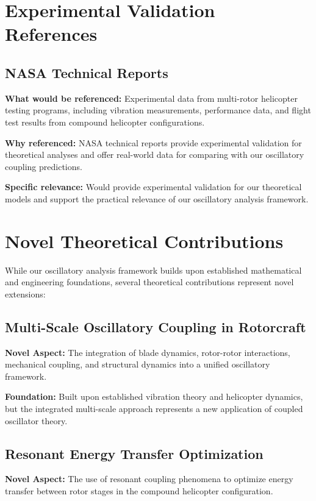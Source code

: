 \documentclass{article}
\begin{document}
\section{Experimental Validation References}

\subsection{NASA Technical Reports}

\textbf{What would be referenced:} Experimental data from multi-rotor helicopter testing programs, including vibration measurements, performance data, and flight test results from compound helicopter configurations.

\textbf{Why referenced:} NASA technical reports provide experimental validation for theoretical analyses and offer real-world data for comparing with our oscillatory coupling predictions.

\textbf{Specific relevance:} Would provide experimental validation for our theoretical models and support the practical relevance of our oscillatory analysis framework.

\section{Novel Theoretical Contributions}

While our oscillatory analysis framework builds upon established mathematical and engineering foundations, several theoretical contributions represent novel extensions:

\subsection{Multi-Scale Oscillatory Coupling in Rotorcraft}

\textbf{Novel Aspect:} The integration of blade dynamics, rotor-rotor interactions, mechanical coupling, and structural dynamics into a unified oscillatory framework.

\textbf{Foundation:} Built upon established vibration theory and helicopter dynamics, but the integrated multi-scale approach represents a new application of coupled oscillator theory.

\subsection{Resonant Energy Transfer Optimization}

\textbf{Novel Aspect:} The use of resonant coupling phenomena to optimize energy transfer between rotor stages in the compound helicopter configuration.
\end{document}
